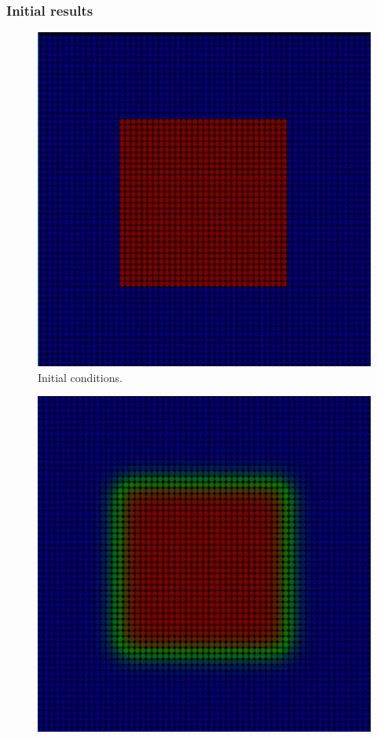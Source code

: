 \documentclass[xcolor=dvipsnames,10pt,aspectratio=169]{beamer}
\begin{document}
\begin{frame}
	\frametitle{Initial results}
	\begin{minipage}[h!]{0.30\textwidth}
		\begin{figure}[h!]
			\centering
			\includegraphics[trim = {1cm 1cm 1cm 1cm}, clip , angle=0, scale=0.3]{figuras/sucesso_!}
			\caption{Initial conditions.}
		\end{figure}
	\end{minipage}
	\begin{minipage}[h!]{0.30\textwidth}
		\begin{figure}[h!]
			\centering
			\includegraphics[trim = {1cm 1cm 1cm 1cm}, clip , angle=0, scale=0.3]{figuras/sucesso_2}

\end{figure}
\end{minipage}
\end{frame}
\end{document}
